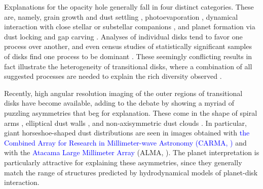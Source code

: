\documentclass[apj]{emulateapj}
\def\blue#1{\textcolor{blue}{ #1}}
\begin{document}
Explanations for the opacity hole generally fall in four distinct
categories. These are, namely, grain growth and dust settling \citep{Brauer07,Dominik-Dullemond08,Zsom11,Birnstiel12}, photoevaporation
\citep{Alexander06,Cieza08,Pascucci-Sterzik09,Owen10}, 
dynamical interaction with close stellar or substellar companions
\citep{Ireland-Kraus08}, and planet
formation via dust locking \citep{Safronov69,Lyttleton72,Goldreich-Ward73,Youdin-Shu02,Johansen07} and gap
carving \citep{Papaloizou-Lin84,Lin-Papaloizou86a,Lin-Papaloizou86b,Bryden99,Paardekooper-Mellema04,Quillen04,Najita07,Andrews11}. 
Analyses of individual disks \citep{Calvet04,Calvet05,Espaillat08} tend to favor one process over another, and even census
studies of statistically significant samples of disks find one process
to be dominant \citep{Najita07,Cieza08}. These
seemingly conflicting results in fact illustrate the
heterogeneity of transitional disks, where a combination of all
suggested processes are needed to explain the rich diversity observed 
\citep{Cieza10,Muzerolle10,Merin10,Rosotti13,Clarke-Owen13}.   

Recently, high angular resolution imaging of the outer regions of transitional 
disks have become available, adding to the debate by showing a myriad of puzzling asymmetries 
that beg for explanation. These come in the shape of spiral arms
\citep{Pietu05,Corder05,Muto12,Tang12},  elliptical dust walls
\citep{Isella12}, and non-axisymmetric dust clouds \citep{Oppenheimer08,Brown09,Casassus12}. In particular, 
giant horseshoe-shaped dust distributions are seen in images obtained with \blue{the Combined Array for Research in Millimeter-wave Astronomy 
(CARMA, \citealt{Isella13})} and with the \blue{Atacama Large Millimeter Array} (ALMA, \citealt{Casassus13,vanderMarel13}). The planet interpretation is particularly attractive for 
explaining these asymmetries, since they generally match the range of structures predicted by hydrodynamical 
models of planet-disk interaction. 
\end{document}
